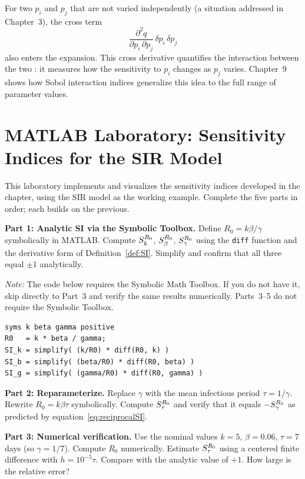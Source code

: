 For two \POIs $p_i$ and $p_j$ that are not varied independently
(a situation addressed in Chapter~3), the cross term
\[
  \frac{\partial^2 q}{\partial p_i\,\partial p_j}\,\delta p_i\,\delta p_j
\]
also enters the expansion. This cross derivative quantifies
the interaction between the two \POIs: it measures how the
sensitivity to $p_i$ changes as $p_j$ varies. Chapter~9 shows
how Sobol interaction indices generalize this idea to the full
range of parameter values.

\section{MATLAB Laboratory: Sensitivity Indices for the SIR Model}
\label{sec:ch2matlab}

This laboratory implements and visualizes the sensitivity indices
developed in the chapter, using the SIR model as the working example.
Complete the five parts in order; each builds on the previous.

\textbf{Part 1: Analytic SI via the Symbolic Toolbox.}
Define $R_0 = k\beta/\gamma$ symbolically in MATLAB.
Compute $S_{k}^{R_0}$, $S_{\beta}^{R_0}$, $S_{\gamma}^{R_0}$ using
the \texttt{diff} function and the derivative form of Definition~\ref{def:SI}.
Simplify and confirm that all three equal $\pm 1$ analytically.

\medskip\noindent
\textit{Note:} The code below requires the Symbolic Math Toolbox.
If you do not have it, skip directly to Part~3 and verify the same
results numerically. Parts~3--5 do not require the Symbolic Toolbox.

\begin{verbatim}
syms k beta gamma positive
R0   = k * beta / gamma;
SI_k = simplify( (k/R0) * diff(R0, k) )
SI_b = simplify( (beta/R0) * diff(R0, beta) )
SI_g = simplify( (gamma/R0) * diff(R0, gamma) )
\end{verbatim}

\textbf{Part 2: Reparameterize.}
Replace $\gamma$ with the mean infectious period $\tau = 1/\gamma$.
Rewrite $R_0 = k\beta\tau$ symbolically.
Compute $S_{\tau}^{R_0}$ and verify that it equals $-S_{\gamma}^{R_0}$
as predicted by equation~\eqref{eq:reciprocalSI}.

\textbf{Part 3: Numerical verification.}
Use the nominal values $k = 5$, $\beta = 0.06$, $\tau = 7$ days
(so $\gamma = 1/7$). Compute $R_0$ numerically. Estimate
$S_{\tau}^{R_0}$ using a centered finite difference with
$h = 10^{-5}\tau$. Compare with the analytic value of $+1$.
How large is the relative error?

